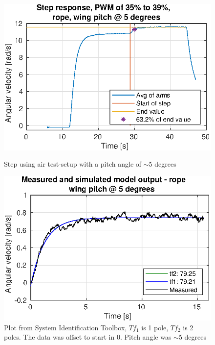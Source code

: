 \begin{figure}[h!]
    \centering
    \begin{minipage}[t]{0.48\textwidth}
        \centering
        \includegraphics[width=1\textwidth]{figures/results/steprope65degrees.eps}
        \caption{Step using air test-setup with a pitch angle of $\sim$5 degrees}
        \label{fig:steprope65}
    \end{minipage}%
    \hspace{.03\textwidth}
    \begin{minipage}[t]{0.48\textwidth}
        \centering
        \includegraphics[width=1\textwidth]{figures/results/steprope65degrees_sysid.eps}
        \caption{Plot from System Identification Toolbox, $Tf_1$ is 1 pole, $Tf_2$ is 2 poles. The data was offset to start in 0. Pitch angle was $\sim$5 degrees}
        \label{fig:steprope65sysid}
    \end{minipage}
\end{figure} 

